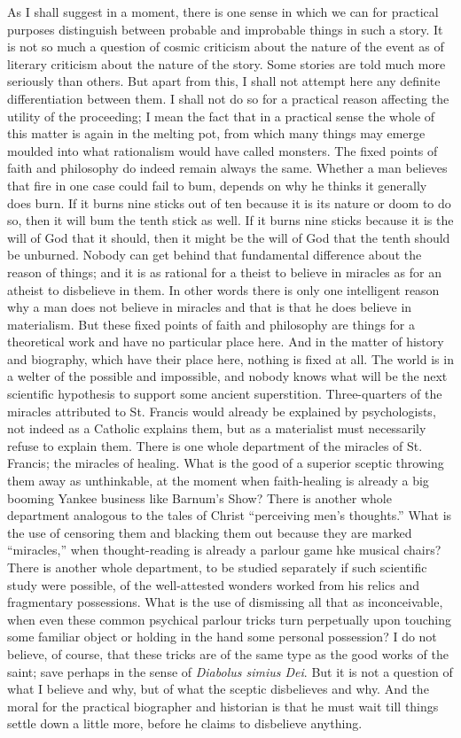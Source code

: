 \documentclass{book}
\begin{document}
As I shall suggest in a moment, there is one sense in which we can for practical purposes distinguish between probable and improbable things in such a story. It is not so much a question of cosmic criticism about the nature of the event as of literary criticism about the nature of the story. Some stories are told much more seriously than others. But apart from this, I shall not attempt here any definite differentiation between them. I shall not do so for a practical reason affecting the utility of the proceeding; I mean the fact that in a practical sense the whole of this matter is again in the melting pot, from which many things may emerge moulded into what rationalism would have called monsters. The fixed points of faith and philosophy do indeed remain always the same. Whether a man believes that fire in one case could fail to bum, depends on why he thinks it generally does burn. If it burns nine sticks out of ten because it is its nature or doom to do so, then it will bum the tenth stick as well. If it burns nine sticks because it is the will of God that it should, then it might be the will of God that the tenth should be unburned. Nobody can get behind that fundamental difference about the reason of things; and it is as rational for a theist to believe in miracles as for an atheist to disbelieve in them. In other words there is only one intelligent reason why a man does not believe in miracles and that is that he does believe in materialism. But these fixed points of faith and philosophy are things for a theoretical work and have no particular place here. And in the matter of history and biography, which have their place here, nothing is fixed at all. The world is in a welter of the possible and impossible, and nobody knows what will be the next scientific hypothesis to support some ancient superstition. Three-quarters of the miracles attributed to St. Francis would already be explained by psychologists, not indeed as a Catholic explains them, but as a materialist must necessarily refuse to explain them. There is one whole department of the miracles of St. Francis; the miracles of healing. What is the good of a superior sceptic throwing them away as unthinkable, at the moment when faith-healing is already a big booming Yankee business like Barnum’s Show? There is another whole department analogous to the tales of Christ “perceiving men’s thoughts.” What is the use of censoring them and blacking them out because they are marked “miracles,” when thought-reading is already a parlour game hke musical chairs? There is another whole department, to be studied separately if such scientific study were possible, of the well-attested wonders worked from his relics and fragmentary possessions. What is the use of dismissing all that as inconceivable, when even these common psychical parlour tricks turn perpetually upon touching some familiar object or holding in the hand some personal possession? I do not believe, of course, that these tricks are of the same type as the good works of the saint; save perhaps in the sense of \emph{Diabolus simius Dei}. But it is not a question of what I believe and why, but of what the sceptic disbelieves and why. And the moral for the practical biographer and historian is that he must wait till things settle down a little more, before he claims to disbelieve anything.
\end{document}
